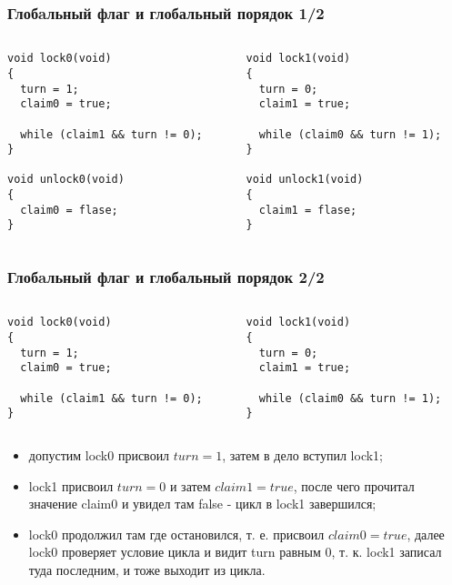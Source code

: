 \begin{frame}[fragile]
\frametitle{Глобaльный флаг и глобальный порядок 1/2}
\begin{columns}
  \begin{column}{.45\linewidth}
    \begin{lstlisting}
void lock0(void)
{
  turn = 1;
  claim0 = true;

  while (claim1 && turn != 0);
}

void unlock0(void)
{
  claim0 = flase;
}
    \end{lstlisting}
  \end{column}
  \begin{column}{.45\linewidth}
    \begin{lstlisting}
void lock1(void)
{
  turn = 0;
  claim1 = true;

  while (claim0 && turn != 1);
}

void unlock1(void)
{
  claim1 = flase;
}
    \end{lstlisting}
  \end{column}
\end{columns}
\end{frame}

\begin{frame}[fragile]
\frametitle{Глобaльный флаг и глобальный порядок 2/2}
\begin{columns}
  \begin{column}{.45\linewidth}
    \begin{lstlisting}
void lock0(void)
{
  turn = 1;
  claim0 = true;

  while (claim1 && turn != 0);
}
    \end{lstlisting}
  \end{column}
  \begin{column}{.45\linewidth}
    \begin{lstlisting}
void lock1(void)
{
  turn = 0;
  claim1 = true;

  while (claim0 && turn != 1);
}
    \end{lstlisting}
  \end{column}
\end{columns}
\begin{itemize}
  \item допустим lock0 присвоил $turn = 1$, затем в дело вступил lock1;
  \item lock1 присвоил $turn = 0$ и затем $claim1 = true$, после чего
  прочитал значение claim0 и увидел там false - цикл в lock1 завершился;
  \item lock0 продолжил там где остановился, т. е. присвоил $claim0 = true$,
  далее lock0 проверяет условие цикла и видит turn равным 0, т. к. lock1
  записал туда последним, и тоже выходит из цикла.
\end{itemize}
\end{frame}


